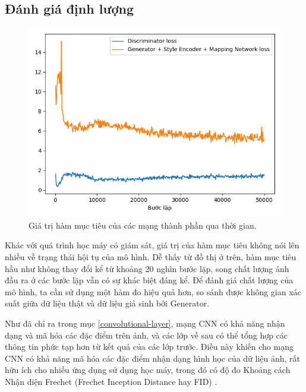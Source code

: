 \documentclass[12pt]{extreport}
\begin{document}
\subsection{Đánh giá định lượng}

\begin{figure}[H]
    \centering
    \includegraphics[width=\linewidth]{figure40.png}
    \caption{Giá trị hàm mục tiêu của các mạng thành phần qua thời gian.}
\end{figure}

Khác với quá trình học máy có giám sát, giá trị của hàm mục tiêu không nói lên nhiều về trạng thái hội tụ của mô hình. Dễ thấy từ đồ thị ở trên, hàm mục tiêu hầu như không thay đổi kể từ khoảng 20 nghìn bước lặp, song chất lượng ảnh đầu ra ở các bước lặp vẫn có sự khác biệt đáng kể. Để đánh giá chất lượng của mô hình, ta cần sử dụng một hàm đo hiệu quả hơn, so sánh được không gian xác suất giữa dữ liệu thật và dữ liệu giả sinh bởi Generator.

Như đã chỉ ra trong mục \ref{convolutional-layer}, mạng CNN có khả năng nhận dạng và mã hóa các đặc điểm trên ảnh, và các lớp về sau có thể tổng hợp các thông tin phức tạp hơn từ kết quả của các lớp trước. Điều này khiến cho mạng CNN có khả năng mã hóa các đặc điểm nhận dạng hình học của dữ liệu ảnh, rất hữu ích cho nhiều ứng dụng sử dụng học máy, trong đó có độ đo Khoảng cách Nhận diện Frechet (Frechet Inception Distance hay FID) \cite{DBLP:journals/corr/HeuselRUNKH17}.
\end{document}

